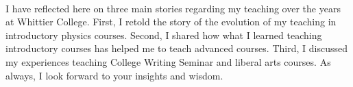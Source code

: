 \documentclass[../../../main.tex]{subfiles}
\begin{document}
\\
\vspace{0.15cm}
I have reflected here on three main stories regarding my teaching over the years at Whittier College.  First, I retold the story of the evolution of my teaching in introductory physics courses.  Second, I shared how what I learned teaching introductory courses has helped me to teach advanced courses.  Third, I discussed my experiences teaching College Writing Seminar and liberal arts courses.  As always, I look forward to your insights and wisdom.
\end{document}
